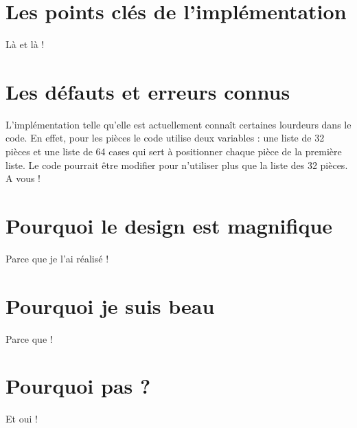 \documentclass[a4paper]{article}
\begin{document}
\section{Les points clés de l'implémentation}

Là et là !

\section{Les défauts et erreurs connus}

L'implémentation telle qu'elle est actuellement connaît certaines lourdeurs dans le code. En effet, pour les pièces le code utilise deux variables : une liste de 32 pièces et une liste de 64 cases qui sert à positionner chaque pièce de la première liste. Le code pourrait être modifier pour n'utiliser plus que la liste des 32 pièces. \\

A vous ! 

\section{Pourquoi le design est magnifique}

Parce que je l'ai réalisé !

\section{Pourquoi je suis beau}

Parce que !

\section{Pourquoi pas ?}

Et oui !
\end{document}
